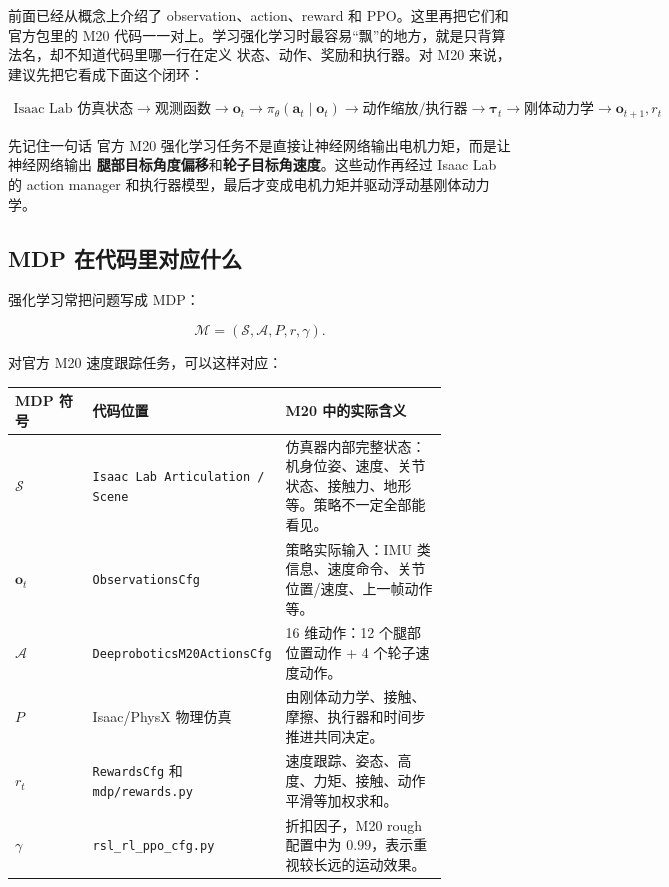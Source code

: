 \documentclass[UTF8,11pt,a4paper]{ctexart}
\newcommand{\bs}[1]{\bm{#1}}
\begin{document}
前面已经从概念上介绍了 observation、action、reward 和 PPO。这里再把它们和官方包里的
M20 代码一一对上。学习强化学习时最容易“飘”的地方，就是只背算法名，却不知道代码里哪一行在定义
状态、动作、奖励和执行器。对 M20 来说，建议先把它看成下面这个闭环：

\[
\boxed{
\begin{array}{c}
\text{Isaac Lab 仿真状态}
\rightarrow
\text{观测函数}
\rightarrow
\bs o_t
\rightarrow
\pi_\theta(\bs a_t\mid \bs o_t)
\rightarrow
\text{动作缩放/执行器}
\rightarrow
\bs\tau_t
\rightarrow
\text{刚体动力学}
\rightarrow
\bs o_{t+1}, r_t
\end{array}
}
\]

\begin{greenbox}{先记住一句话}
官方 M20 强化学习任务不是直接让神经网络输出电机力矩，而是让神经网络输出
\textbf{腿部目标角度偏移}和\textbf{轮子目标角速度}。这些动作再经过 Isaac Lab 的 action manager
和执行器模型，最后才变成电机力矩并驱动浮动基刚体动力学。
\end{greenbox}

\subsection{MDP 在代码里对应什么}

强化学习常把问题写成 MDP：

\[
\mathcal M=(\mathcal S,\mathcal A,P,r,\gamma).
\]

对官方 M20 速度跟踪任务，可以这样对应：

\begin{center}
\renewcommand{\arraystretch}{1.25}
\begin{tabular}{p{0.18\linewidth}p{0.30\linewidth}p{0.38\linewidth}}
\toprule
\textbf{MDP 符号} & \textbf{代码位置} & \textbf{M20 中的实际含义}\\
\midrule
\(\mathcal S\) &
\texttt{Isaac Lab Articulation / Scene} &
仿真器内部完整状态：机身位姿、速度、关节状态、接触力、地形等。策略不一定全部能看见。\\
\(\bs o_t\) &
\texttt{ObservationsCfg} &
策略实际输入：IMU 类信息、速度命令、关节位置/速度、上一帧动作等。\\
\(\mathcal A\) &
\texttt{DeeproboticsM20ActionsCfg} &
16 维动作：12 个腿部位置动作 + 4 个轮子速度动作。\\
\(P\) &
Isaac/PhysX 物理仿真 &
由刚体动力学、接触、摩擦、执行器和时间步推进共同决定。\\
\(r_t\) &
\texttt{RewardsCfg} 和 \texttt{mdp/rewards.py} &
速度跟踪、姿态、高度、力矩、接触、动作平滑等加权求和。\\
\(\gamma\) &
\texttt{rsl\_rl\_ppo\_cfg.py} &
折扣因子，M20 rough 配置中为 \(0.99\)，表示重视较长远的运动效果。\\
\bottomrule
\end{tabular}
\end{center}
\end{document}
